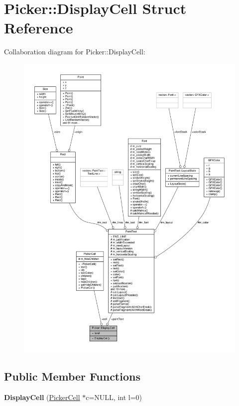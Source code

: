 \hypertarget{structPicker_1_1DisplayCell}{}\section{Picker\+:\+:Display\+Cell Struct Reference}
\label{structPicker_1_1DisplayCell}


Collaboration diagram for Picker\+:\+:Display\+Cell\+:
\nopagebreak
\begin{figure}[H]
\begin{center}
\leavevmode
\includegraphics[width=350pt]{dc/dd3/structPicker_1_1DisplayCell__coll__graph}
\end{center}
\end{figure}
\subsection*{Public Member Functions}
\begin{DoxyCompactItemize}
\item 
{\bfseries Display\+Cell} (\hyperlink{classPickerCell}{Picker\+Cell} $\ast$c=N\+U\+LL, int l=0)\hypertarget{structPicker_1_1DisplayCell_ae9402f53a25afccfa48597e7283a088c}{}\label{structPicker_1_1DisplayCell_ae9402f53a25afccfa48597e7283a088c}

\end{DoxyCompactItemize}
